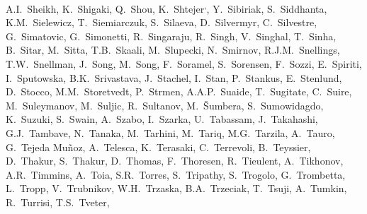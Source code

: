 \begin{flushleft}
A.I.~Sheikh\And, 
K.~Shigaki\And, 
Q.~Shou\And, 
K.~Shtejer\textsuperscript{,}\And, 
Y.~Sibiriak\And, 
S.~Siddhanta\And, 
K.M.~Sielewicz\And, 
T.~Siemiarczuk\And, 
S.~Silaeva\And, 
D.~Silvermyr\And, 
C.~Silvestre\And, 
G.~Simatovic\And, 
G.~Simonetti\And, 
R.~Singaraju\And, 
R.~Singh\And, 
V.~Singhal\And, 
T.~Sinha\And, 
B.~Sitar\And, 
M.~Sitta\And, 
T.B.~Skaali\And, 
M.~Slupecki\And, 
N.~Smirnov\And, 
R.J.M.~Snellings\And, 
T.W.~Snellman\And, 
J.~Song\And, 
M.~Song\And, 
F.~Soramel\And, 
S.~Sorensen\And, 
F.~Sozzi\And, 
E.~Spiriti\And, 
I.~Sputowska\And, 
B.K.~Srivastava\And, 
J.~Stachel\And, 
I.~Stan\And, 
P.~Stankus\And, 
E.~Stenlund\And, 
D.~Stocco\And, 
M.M.~Storetvedt\And, 
P.~Strmen\And, 
A.A.P.~Suaide\And, 
T.~Sugitate\And, 
C.~Suire\And, 
M.~Suleymanov\And, 
M.~Suljic\And, 
R.~Sultanov\And, 
M.~\v{S}umbera\And, 
S.~Sumowidagdo\And, 
K.~Suzuki\And, 
S.~Swain\And, 
A.~Szabo\And, 
I.~Szarka\And, 
U.~Tabassam\And, 
J.~Takahashi\And, 
G.J.~Tambave\And, 
N.~Tanaka\And, 
M.~Tarhini\And, 
M.~Tariq\And, 
M.G.~Tarzila\And, 
A.~Tauro\And, 
G.~Tejeda Mu\~{n}oz\And, 
A.~Telesca\And, 
K.~Terasaki\And, 
C.~Terrevoli\And, 
B.~Teyssier\And, 
D.~Thakur\And, 
S.~Thakur\And, 
D.~Thomas\And, 
F.~Thoresen\And, 
R.~Tieulent\And, 
A.~Tikhonov\And, 
A.R.~Timmins\And, 
A.~Toia\And, 
S.R.~Torres\And, 
S.~Tripathy\And, 
S.~Trogolo\And, 
G.~Trombetta\And, 
L.~Tropp\And, 
V.~Trubnikov\And, 
W.H.~Trzaska\And, 
B.A.~Trzeciak\And, 
T.~Tsuji\And, 
A.~Tumkin\And, 
R.~Turrisi\And, 
T.S.~Tveter\And, 

\end{flushleft}
